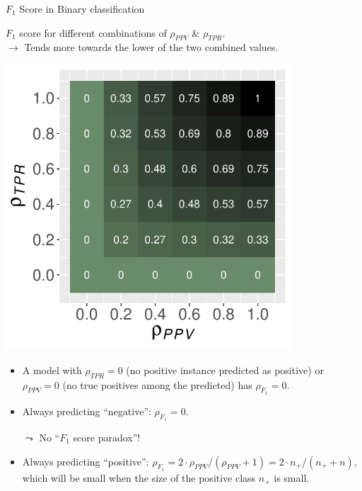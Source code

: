 \documentclass[11pt,compress,t,notes=noshow, xcolor=table]{beamer}
\newcommand{\np}{n_{+}} %
\begin{document}
\begin{vbframe}{$F_1$ Score in Binary classification}
	\begin{minipage}[c]{0.5\textwidth}
		\footnotesize
		$F_1$ score for different combinations of $\rho_{PPV}$ \& $\rho_{TPR}$. \\
		$\rightarrow$ Tends more towards the lower of the two combined values.
	\end{minipage}%
	\begin{minipage}[c]{0.5\textwidth}
		\centering
		\includegraphics[width=0.8\textwidth]{figure/f1_score_plot.pdf}
	\end{minipage}
	
	\begin{itemize}
		\item A model with $\rho_{TPR} = 0$ (no positive instance predicted as 
		positive) or 
		$\rho_{PPV} = 0$ (no true positives among the predicted) has $\rho_{F_1} = 0$.
		\item Always predicting \enquote{negative}: $\rho_{F_1} = 0$.
		\item [$\leadsto$] No ``$F_1$ score paradox''!
		\item Always predicting \enquote{positive}: $\rho_{F_1} = 2 \cdot \rho_{PPV} / 
		(\rho_{PPV} + 1) = 2 \cdot \np / (\np + n)$,\\ 
		which will be small when the size of the positive class $\np$ is small.
	\end{itemize}
	
\end{vbframe}
\end{document}
